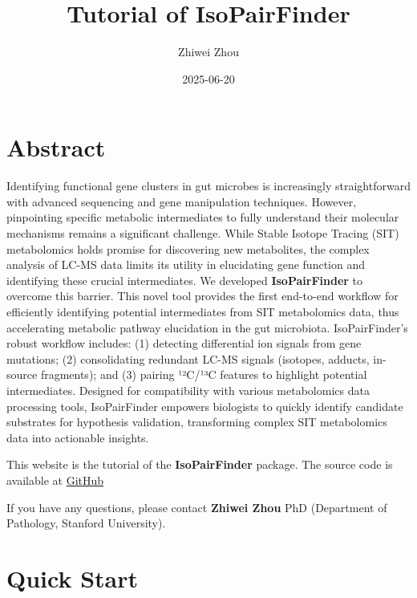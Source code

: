 \documentclass[
  letterpaper,
  DIV=11,
  numbers=noendperiod]{scrreprt}
\title{Tutorial of IsoPairFinder}
\author{Zhiwei Zhou}
\date{2025-06-20}
\renewcommand*\contentsname{Table of contents}
\newcommand\contentsname{Table of contents}
\begin{document}
\maketitle

\renewcommand*\contentsname{Table of contents}
{
\hypersetup{linkcolor=}
\setcounter{tocdepth}{2}
\tableofcontents
}


\chapter*{Abstract}\label{abstract}


Identifying functional gene clusters in gut microbes is increasingly
straightforward with advanced sequencing and gene manipulation
techniques. However, pinpointing specific metabolic intermediates to
fully understand their molecular mechanisms remains a significant
challenge. While Stable Isotope Tracing (SIT) metabolomics holds promise
for discovering new metabolites, the complex analysis of LC-MS data
limits its utility in elucidating gene function and identifying these
crucial intermediates. We developed \textbf{IsoPairFinder} to overcome
this barrier. This novel tool provides the first end-to-end workflow for
efficiently identifying potential intermediates from SIT metabolomics
data, thus accelerating metabolic pathway elucidation in the gut
microbiota. IsoPairFinder's robust workflow includes: (1) detecting
differential ion signals from gene mutations; (2) consolidating
redundant LC-MS signals (isotopes, adducts, in-source fragments); and
(3) pairing ¹²C/¹³C features to highlight potential intermediates.
Designed for compatibility with various metabolomics data processing
tools, IsoPairFinder empowers biologists to quickly identify candidate
substrates for hypothesis validation, transforming complex SIT
metabolomics data into actionable insights.

This website is the tutorial of the \textbf{IsoPairFinder} package. The
source code is available at
\href{https://github.com/DoddLab/IsoPairFinder}{GitHub}

If you have any questions, please contact \textbf{Zhiwei Zhou} PhD
(Department of Pathology, Stanford University).


\chapter{Quick Start}\label{sec-quick-start}
\end{document}
